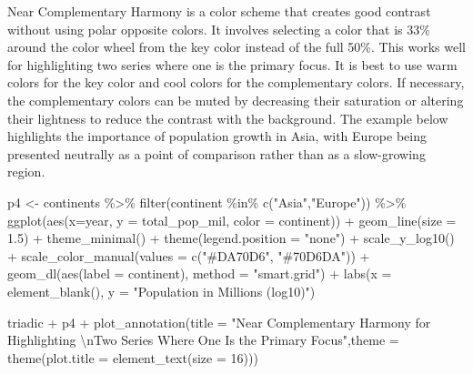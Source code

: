 \documentclass[
  letterpaper,
]{book}
\newenvironment{Shaded}{\begin{snugshade}}{\end{snugshade}}
\newcommand{\AttributeTok}[1]{\textcolor[rgb]{0.40,0.45,0.13}{#1}}
\newcommand{\DecValTok}[1]{\textcolor[rgb]{0.68,0.00,0.00}{#1}}
\newcommand{\FloatTok}[1]{\textcolor[rgb]{0.68,0.00,0.00}{#1}}
\newcommand{\FunctionTok}[1]{\textcolor[rgb]{0.28,0.35,0.67}{#1}}
\newcommand{\NormalTok}[1]{\textcolor[rgb]{0.00,0.23,0.31}{#1}}
\newcommand{\OtherTok}[1]{\textcolor[rgb]{0.00,0.23,0.31}{#1}}
\newcommand{\SpecialCharTok}[1]{\textcolor[rgb]{0.37,0.37,0.37}{#1}}
\newcommand{\StringTok}[1]{\textcolor[rgb]{0.13,0.47,0.30}{#1}}
\begin{document}
Near Complementary Harmony is a color scheme that creates good contrast
without using polar opposite colors. It involves selecting a color that
is 33\% around the color wheel from the key color instead of the full
50\%. This works well for highlighting two series where one is the
primary focus. It is best to use warm colors for the key color and cool
colors for the complementary colors. If necessary, the complementary
colors can be muted by decreasing their saturation or altering their
lightness to reduce the contrast with the background. The example below
highlights the importance of population growth in Asia, with Europe
being presented neutrally as a point of comparison rather than as a
slow-growing region.

\begin{Shaded}
\begin{Highlighting}[]
\NormalTok{p4 }\OtherTok{\textless{}{-}}\NormalTok{ continents }\SpecialCharTok{\%\textgreater{}\%} 
  \FunctionTok{filter}\NormalTok{(continent }\SpecialCharTok{\%in\%} \FunctionTok{c}\NormalTok{(}\StringTok{"Asia"}\NormalTok{,}\StringTok{"Europe"}\NormalTok{)) }\SpecialCharTok{\%\textgreater{}\%} 
  \FunctionTok{ggplot}\NormalTok{(}\FunctionTok{aes}\NormalTok{(}\AttributeTok{x=}\NormalTok{year, }\AttributeTok{y =}\NormalTok{ total\_pop\_mil, }\AttributeTok{color =}\NormalTok{ continent)) }\SpecialCharTok{+} 
  \FunctionTok{geom\_line}\NormalTok{(}\AttributeTok{size =} \FloatTok{1.5}\NormalTok{) }\SpecialCharTok{+} 
  \FunctionTok{theme\_minimal}\NormalTok{() }\SpecialCharTok{+} 
  \FunctionTok{theme}\NormalTok{(}\AttributeTok{legend.position =} \StringTok{"none"}\NormalTok{) }\SpecialCharTok{+}
  \FunctionTok{scale\_y\_log10}\NormalTok{() }\SpecialCharTok{+}
  \FunctionTok{scale\_color\_manual}\NormalTok{(}\AttributeTok{values =} \FunctionTok{c}\NormalTok{(}\StringTok{"\#DA70D6"}\NormalTok{, }\StringTok{"\#70D6DA"}\NormalTok{))  }\SpecialCharTok{+}
  \FunctionTok{geom\_dl}\NormalTok{(}\FunctionTok{aes}\NormalTok{(}\AttributeTok{label =}\NormalTok{ continent), }\AttributeTok{method =} \StringTok{"smart.grid"}\NormalTok{) }\SpecialCharTok{+}
  \FunctionTok{labs}\NormalTok{(}\AttributeTok{x =} \FunctionTok{element\_blank}\NormalTok{(), }\AttributeTok{y =} \StringTok{"Population in Millions (log10)"}\NormalTok{)}

\NormalTok{triadic }\SpecialCharTok{+}\NormalTok{ p4 }\SpecialCharTok{+} \FunctionTok{plot\_annotation}\NormalTok{(}\AttributeTok{title =} \StringTok{"Near Complementary Harmony for Highlighting }\SpecialCharTok{\textbackslash{}n}\StringTok{Two Series Where One Is the Primary Focus"}\NormalTok{,}\AttributeTok{theme =} \FunctionTok{theme}\NormalTok{(}\AttributeTok{plot.title =} \FunctionTok{element\_text}\NormalTok{(}\AttributeTok{size =} \DecValTok{16}\NormalTok{)))}
\end{Highlighting}
\end{Shaded}
\end{document}

